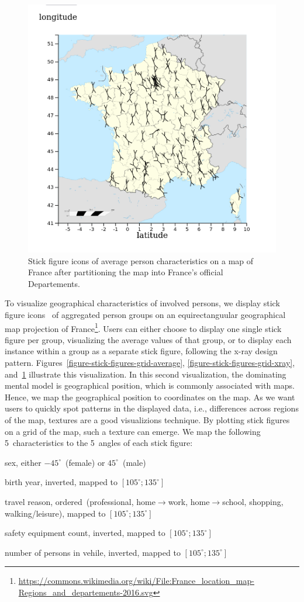 \begin{figure}
    \centering
    \includegraphics[width=0.6\linewidth]{figures/stick-figures-by-department-average.png}
    \caption{Stick figure icons of average person characteristics on a map of France after partitioning the map into France's official Departements.}
    \label{figure-stick-figures-departments-average}
\end{figure}
To visualize geographical characteristics of involved persons, we display stick figure icons~\cite{PickettG1988} of aggregated person groups on an equirectanguular geographical map projection of France\footnote{\url{https://commons.wikimedia.org/wiki/File:France_location_map-Regions_and_departements-2016.svg}}.
Users can either choose to display one single stick figure per group, visualizing the average values of that group, or to display each instance within a group as a separate stick figure, following the x-ray design pattern.
Figures~\ref{figure-stick-figures-grid-average}, \ref{figure-stick-figures-grid-xray}, and~\ref{figure-stick-figures-departments-average} illustrate this visualization.
In this second visualization, the dominating mental model is geographical position, which is commonly associated with maps. Hence, we map the geographical position to coordinates on the map. As we want users to quickly spot patterns in the displayed data, i.e., differences across regions of the map, textures are a good visualizions technique.
By plotting stick figures on a grid of the map, such a texture can emerge. We map the following 5~characteristics to the 5~angles of each stick figure:
\begin{description}
    \setlength{\itemsep}{1pt}
    \item[\(\alpha\)] sex, either \(-45^\circ\)~(female) or \(45^\circ\)~(male)
    \item[\(\beta\)] birth year, inverted, mapped to  \([105^\circ; 135^\circ]\)
    \item[\(\gamma\)] travel reason, ordered~(professional, home\(\to\)work, home\(\to\)school, shopping, walking/leisure), mapped to  \([105^\circ; 135^\circ]\)
    \item[\(\delta\)] safety equipment count, inverted, mapped to  \([105^\circ; 135^\circ]\)
    \item[\(\epsilon\)] number of persons in vehile, inverted, mapped to  \([105^\circ; 135^\circ]\)
\end{description}
